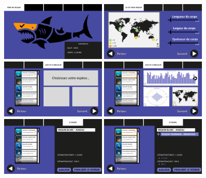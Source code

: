 \documentclass{article}
\begin{document}
\begin{figure}[!h]

	\centering
	\includegraphics[width=0.45\textwidth]{assets/prototype/haute/Diapositive17}
	\hfill
	\includegraphics[width=0.45\textwidth]{assets/prototype/haute/Diapositive18}
	\includegraphics[width=0.45\textwidth]{assets/prototype/haute/Diapositive19}
	\hfill
	\includegraphics[width=0.45\textwidth]{assets/prototype/haute/Diapositive20}
	\includegraphics[width=0.45\textwidth]{assets/prototype/haute/Diapositive21}
	\hfill
	\includegraphics[width=0.45\textwidth]{assets/prototype/haute/Diapositive22}

\end{figure}
\end{document}
